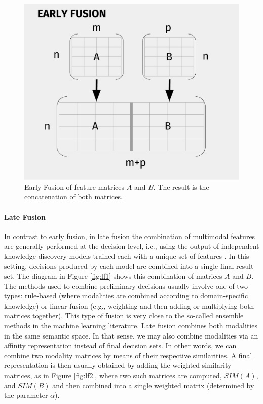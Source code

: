 \begin{figure}
\centering
\includegraphics[width=0.7\linewidth]{images/Chapitre3/ef_diag.pdf}
\caption{Early Fusion of feature matrices $A$ and $B$. The result is the concatenation of both matrices.}
\label{fig:ef_diag}
\end{figure}


%


%
\paragraph{Late Fusion}
In contrast to early fusion, in late fusion the combination of multimodal features are generally performed at the decision level, i.e., using the output of independent knowledge discovery models trained  each with a unique set of features \cite{ClinchantAC11}. In this setting,  decisions produced by each model are combined into a single final result set. The diagram in Figure \ref{fig:lf1} shows this combination of matrices $A$ and $B$.
%
The methods used to combine preliminary decisions usually involve one of two types: rule-based (where modalities are combined according to domain-specific knowledge) or linear fusion (e.g., weighting and then adding or multiplying both matrices together). This type of fusion is very close to the so-called ensemble methods in the machine learning literature.
%
Late fusion combines both modalities in the same semantic space. In that sense,  we may also combine modalities via an affinity representation instead of final decision sets. In other words, we can combine two modality matrices by means of their respective similarities. A final representation is then usually obtained by adding the weighted similarity matrices, as in Figure \ref{fig:lf2}, where two such matrices are computed, $SIM(A)$, and $SIM(B)$ and then combined into a single weighted matrix (determined by the parameter $\alpha$).
%

